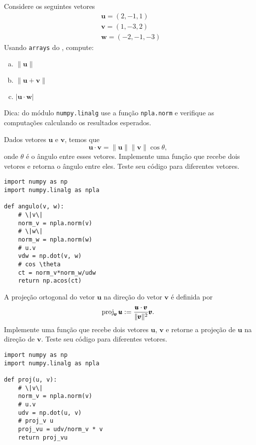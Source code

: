 \begin{exer}
  Considere os seguintes vetores
  \begin{align}
    &\pmb{u} = (2, -1, 1)\\
    &\pmb{v} = (1, -3, 2)\\
    &\pmb{w} = (-2, -1, -3)
  \end{align}
  Usando \lstinline+arrays+ do {\numpy}, compute:
  \begin{enumerate}[a)]
  \item $\|\pmb{u}\|$
  \item $\|\pmb{u} + \pmb{v}\|$
  \item $|\pmb{u}\cdot \pmb{w}|$
  \end{enumerate}
\end{exer}
\begin{resp}
  Dica: do módulo \lstinline+numpy.linalg+ use a função \lstinline+npla.norm+ e verifique as computações calculando os resultados esperados.
\end{resp}

\begin{exer}
  Dados vetores $\pmb{u}$ e $\pmb{v}$, temos que
  \begin{equation}
    \pmb{u}\cdot\pmb{v} = \|\pmb{u}\|\|\pmb{v}\|\cos\theta,
  \end{equation}
  onde $\theta$ é o ângulo entre esses vetores. Implemente uma função que recebe dois vetores e retorna o ângulo entre eles. Teste seu código para diferentes vetores.
\end{exer}
\begin{resp}
\begin{lstlisting}
import numpy as np
import numpy.linalg as npla

def angulo(v, w):
    # \|v\|
    norm_v = npla.norm(v)
    # \|w\|
    norm_w = npla.norm(w)
    # u.v
    vdw = np.dot(v, w)
    # cos \theta
    ct = norm_v*norm_w/udw
    return np.acos(ct)
\end{lstlisting}
\end{resp}

\begin{exer}
  A projeção ortogonal do vetor $\pmb{u}$ na direção do vetor $\pmb{v}$ é definida por
  \begin{equation}
    \operatorname{proj}_{\pmb{v}} \pmb{u} := \frac{\pmb{u}\cdot\pmb{v}}{\|\pmb{v}\|^2}\pmb{v}.
  \end{equation}
  Implemente uma função que recebe dois vetores $\pmb{u}$, $\pmb{v}$ e retorne a projeção de $\pmb{u}$ na direção de $\pmb{v}$. Teste seu código para diferentes vetores.
\end{exer}
\begin{resp}
\begin{lstlisting}
import numpy as np
import numpy.linalg as npla

def proj(u, v):
    # \|v\|
    norm_v = npla.norm(v)
    # u.v
    udv = np.dot(u, v)
    # proj_v u
    proj_vu = udv/norm_v * v
    return proj_vu
\end{lstlisting}
\end{resp}

